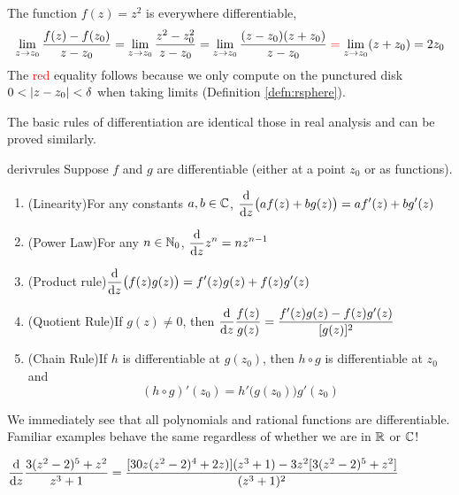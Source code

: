 

\begin{example}{}{}
	The function $f(z)=z^2$ is everywhere differentiable,
  \[
  	\lim_{z\to z_0}\frac{f(z)-f(z_0)}{z-z_0} =\lim_{z\to z_0}\frac{z^2-z_0^2}{z-z_0} =\lim_{z\to z_0}\frac{(z-z_0)(z+z_0)}{z-z_0} \mathrel{\textcolor{red}{=}} \lim_{z\to z_0}(z+z_0) =2z_0
  \]
	The \textcolor{red}{red} equality follows because we only compute on the punctured disk $0<\left| z-z_0\right|<\delta$ when taking limits (Definition \ref{defn:rsphere}).
\end{example}


The basic rules of differentiation are identical those in real analysis and can be proved similarly.

\begin{thm}{}{derivrules}
	Suppose $f$ and $g$ are differentiable (either at a point $z_0$ or as functions).
	\begin{enumerate}
	  \item (Linearity)\quad For any constants $a,b\in\mathbb{C}$, $\displaystyle\frac{\mathrm{d} }{\mathrm{d} z}\bigl(af(z)+bg(z)\bigr)=af'(z)+bg'(z)$
	  \item (Power Law)\quad For any $n\in\mathbb{N}_0$, $\displaystyle\frac{\mathrm{d} }{\mathrm{d} z}z^n=nz^{n-1}$
	  \item (Product rule)\quad $\displaystyle\frac{\mathrm{d} }{\mathrm{d} z}\bigl(f(z)g(z)\bigr)=f'(z)g(z)+f(z)g'(z)$
	  \item (Quotient Rule)\quad If $g(z)\neq 0$, then $\displaystyle\frac{\mathrm{d} }{\mathrm{d} z}\frac{f(z)}{g(z)}=\frac{f'(z)g(z)-f(z)g'(z)}{[g(z)]^2}$
	  \item (Chain Rule)\quad If $h$ is differentiable at $g(z_0)$, then $h\circ g$ is differentiable at $z_0$ and
	  \[
	  	(h\circ g)'(z_0)=h'\bigl(g(z_0)\bigr)g'(z_0)
	  \]
	\end{enumerate}
\end{thm}

We immediately see that all polynomials and rational functions are differentiable. Familiar examples behave the same regardless of whether we are in $\mathbb{R}$ or $\mathbb{C}$!

\begin{example}{}{}
  $\displaystyle\frac{\mathrm{d} }{\mathrm{d} z}\frac{3(z^2-2)^5+z^2}{z^3+1} = \frac{[30z(z^2-2)^4+2z)](z^3+1) -3z^2[3(z^2-2)^5+z^2]}{(z^3+1)^2}$
\end{example}


